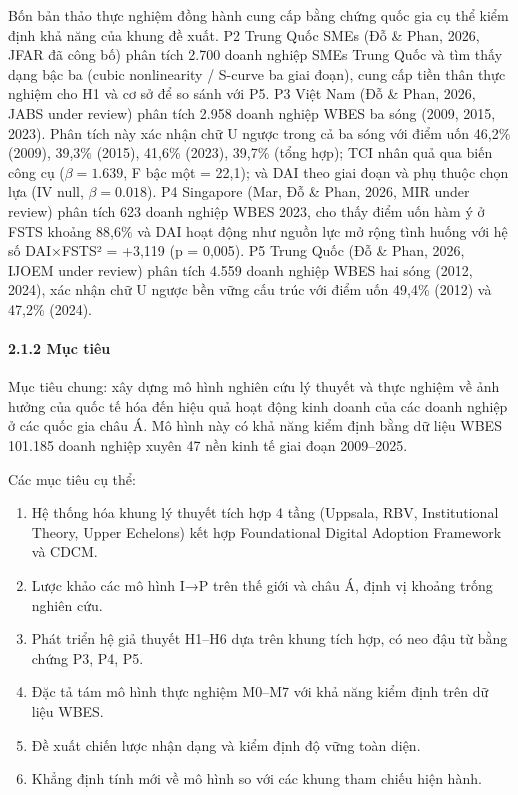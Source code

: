 \documentclass[12pt,a4paper]{article}
\begin{document}
Bốn bản thảo thực nghiệm đồng hành cung cấp bằng chứng quốc gia cụ thể
kiểm định khả năng của khung đề xuất. P2 Trung Quốc SMEs (Đỗ \& Phan,
2026, JFAR đã công bố) phân tích 2.700 doanh nghiệp SMEs Trung Quốc và
tìm thấy dạng bậc ba (cubic nonlinearity / S-curve ba giai đoạn), cung
cấp tiền thân thực nghiệm cho H1 và cơ sở để so sánh với P5. P3 Việt Nam
(Đỗ \& Phan, 2026, JABS under review) phân tích 2.958 doanh nghiệp WBES
ba sóng (2009, 2015, 2023). Phân tích này xác nhận chữ U ngược trong cả
ba sóng với điểm uốn 46,2\% (2009), 39,3\% (2015), 41,6\% (2023), 39,7\%
(tổng hợp); TCI nhân quả qua biến công cụ (\(\beta = 1.639\), F bậc một
= 22,1); và DAI theo giai đoạn và phụ thuộc chọn lựa (IV null,
\(\beta = 0.018\)). P4 Singapore (Mar, Đỗ \& Phan, 2026, MIR under
review) phân tích 623 doanh nghiệp WBES 2023, cho thấy điểm uốn hàm ý ở
FSTS khoảng 88,6\% và DAI hoạt động như nguồn lực mở rộng tình huống với
hệ số DAI×FSTS² = +3,119 (p = 0,005). P5 Trung Quốc (Đỗ \& Phan, 2026,
IJOEM under review) phân tích 4.559 doanh nghiệp WBES hai sóng (2012,
2024), xác nhận chữ U ngược bền vững cấu trúc với điểm uốn 49,4\% (2012)
và 47,2\% (2024).

\hypertarget{212-mux1ee5c-tiuxeau}{%
\paragraph{2.1.2 Mục tiêu}\label{212-mux1ee5c-tiuxeau}}

Mục tiêu chung: xây dựng mô hình nghiên cứu lý thuyết và thực nghiệm về
ảnh hưởng của quốc tế hóa đến hiệu quả hoạt động kinh doanh của các
doanh nghiệp ở các quốc gia châu Á. Mô hình này có khả năng kiểm định
bằng dữ liệu WBES 101.185 doanh nghiệp xuyên 47 nền kinh tế giai đoạn
2009--2025.

Các mục tiêu cụ thể:

\begin{enumerate}
\def\labelenumi{\arabic{enumi}.}
\item
  Hệ thống hóa khung lý thuyết tích hợp 4 tầng (Uppsala, RBV,
  Institutional Theory, Upper Echelons) kết hợp Foundational Digital
  Adoption Framework và CDCM.
\item
  Lược khảo các mô hình I→P trên thế giới và châu Á, định vị khoảng
  trống nghiên cứu.
\item
  Phát triển hệ giả thuyết H1--H6 dựa trên khung tích hợp, có neo đậu từ
  bằng chứng P3, P4, P5.
\item
  Đặc tả tám mô hình thực nghiệm M0--M7 với khả năng kiểm định trên dữ
  liệu WBES.
\item
  Đề xuất chiến lược nhận dạng và kiểm định độ vững toàn diện.
\item
  Khẳng định tính mới về mô hình so với các khung tham chiếu hiện hành.
\end{enumerate}
\end{document}

